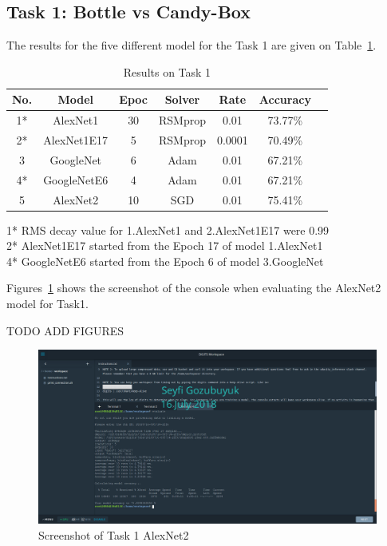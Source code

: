 \documentclass[10pt,journal,compsoc]{IEEEtran}
\begin{document}
\subsection{Task 1: Bottle vs Candy-Box}
The results for the five different model for the Task 1 are given on Table~\ref{table:t1r}.

\begin{table}[h]
\caption{Results on Task 1}
\label{table:t1r}
\begin{center}
\begin{tabular}{|c||c||c||c||c||c||c|}
\hline
No. & Model & Epoc & Solver & Rate & Accuracy \\
\hline
1* & AlexNet1 & 30 & RSMprop & 0.01 & 73.77\%\\
\hline
2* & AlexNet1E17 & 5 & RSMprop & 0.0001 & 70.49\%\\
\hline
3 & GoogleNet & 6 & Adam & 0.01 & 67.21\%\\
\hline
4* & GoogleNetE6 & 4 & Adam & 0.01 & 67.21\%\\
\hline
5 & AlexNet2 & 10 & SGD & 0.01 & 75.41\%\\
\hline
\end{tabular}
\end{center}
1* RMS decay value for 1.AlexNet1 and 2.AlexNet1E17 were 0.99\\
2* AlexNet1E17 started from the Epoch 17 of model 1.AlexNet1\\
4* GoogleNetE6 started from the Epoch 6 of model 3.GoogleNet
\end{table}

Figures~\ref{fig:t1a2c} shows the screenshot of the console when evaluating the AlexNet2 model for Task1.

TODO ADD FIGURES
\begin{figure}[thpb]
      \centering
      \includegraphics[width=\linewidth]{figures/t1a2c.png}
      \caption{Screenshot of Task 1 AlexNet2}
      \label{fig:t1a2c}
\end{figure}
\end{document}

